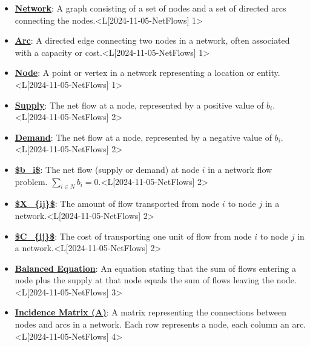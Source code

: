 \documentclass{article}%
\begin{document}
\begin{itemize}[[leftmargin=*]]%
\item \href{https://www.math.purdue.edu/~yipn/421/2024-11-05-NetFlows.pdf#page=1}{\textbf{Network}}: A graph consisting of a set of nodes and a set of directed arcs connecting the nodes.<L[2024-11-05-NetFlows] 1>%
\item \href{https://www.math.purdue.edu/~yipn/421/2024-11-05-NetFlows.pdf#page=1}{\textbf{Arc}}: A directed edge connecting two nodes in a network, often associated with a capacity or cost.<L[2024-11-05-NetFlows] 1>%
\item \href{https://www.math.purdue.edu/~yipn/421/2024-11-05-NetFlows.pdf#page=1}{\textbf{Node}}: A point or vertex in a network representing a location or entity.<L[2024-11-05-NetFlows] 1>%
\item \href{https://www.math.purdue.edu/~yipn/421/2024-11-05-NetFlows.pdf#page=2}{\textbf{Supply}}: The net flow at a node, represented by a positive value of $b_i$.<L[2024-11-05-NetFlows] 2>%
\item \href{https://www.math.purdue.edu/~yipn/421/2024-11-05-NetFlows.pdf#page=2}{\textbf{Demand}}: The net flow at a node, represented by a negative value of $b_i$.<L[2024-11-05-NetFlows] 2>%
\item \href{https://www.math.purdue.edu/~yipn/421/2024-11-05-NetFlows.pdf#page=2}{\textbf{\$b\_i\$}}: The net flow (supply or demand) at node $i$ in a network flow problem. $\sum_{i \in N} b_i = 0$.<L[2024-11-05-NetFlows] 2>%
\item \href{https://www.math.purdue.edu/~yipn/421/2024-11-05-NetFlows.pdf#page=2}{\textbf{\$X\_\{ij\}\$}}: The amount of flow transported from node $i$ to node $j$ in a network.<L[2024-11-05-NetFlows] 2>%
\item \href{https://www.math.purdue.edu/~yipn/421/2024-11-05-NetFlows.pdf#page=2}{\textbf{\$C\_\{ij\}\$}}: The cost of transporting one unit of flow from node $i$ to node $j$ in a network.<L[2024-11-05-NetFlows] 2>%
\item \href{https://www.math.purdue.edu/~yipn/421/2024-11-05-NetFlows.pdf#page=3}{\textbf{Balanced Equation}}: An equation stating that the sum of flows entering a node plus the supply at that node equals the sum of flows leaving the node.<L[2024-11-05-NetFlows] 3>%
\item \href{https://www.math.purdue.edu/~yipn/421/2024-11-05-NetFlows.pdf#page=4}{\textbf{Incidence Matrix (A)}}: A matrix representing the connections between nodes and arcs in a network. Each row represents a node, each column an arc.<L[2024-11-05-NetFlows] 4>%

\end{itemize}
\end{document}
